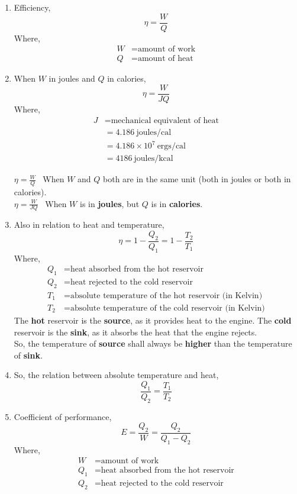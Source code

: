\documentclass[12pt]{article}
\begin{document}
\begin{enumerate}[label=\roman*.]
	\item Efficiency,
		$$ \eta = \frac{W}{Q} $$
		Where,
		\begin{align*}
			W &= \text{amount of work} \\
			Q &= \text{amount of heat}
		\end{align*}

	\item When $W$ in joules and $Q$ in calories,
		$$ \eta = \frac{W}{JQ} $$
		Where,
		\begin{align*}
			J  &= \text{mechanical equivalent of heat} \\
			   &= 4.186 \ \text{joules/cal} \\
			   &= 4.186 \times 10^7 \ \text{ergs/cal} \\
			   &= 4186 \ \text{joules/kcal}
		\end{align*}

	$ \eta = \frac{W}{Q} $ \rightarrow \ When $W$ and $Q$ both are in the same
		unit (both in joules or both in calories). \\
	$ \eta = \frac{W}{JQ} $ \rightarrow \ When $W$ is in \textbf{joules}, but
		$Q$ is in \textbf{calories}.

	\item Also in relation to heat and temperature,
		$$ \eta = 1 - \frac{Q_{2}}{Q_{1}} = 1 - \frac{T_{2}}{T_{1}} $$
		Where,
		\begin{align*}
			Q_{1} &= \text{heat absorbed from the hot reservoir} \\
			Q_{2} &= \text{heat rejected to the cold reservoir} \\
			T_{1} &= \text{absolute temperature of the hot reservoir (in Kelvin)} \\
			T_{2} &= \text{absolute temperature of the cold reservoir (in Kelvin)}
		\end{align*}
		The \textbf{hot} reservoir is the \textbf{source}, as it provides heat
		to the engine. The \textbf{cold} reservoir is the \textbf{sink}, as it
		absorbs the heat that the engine rejects. \\
		So, the temperature of \textbf{source} shall always be \textbf{higher}
		than the temperature of \textbf{sink}.

	\item So, the relation between absolute temperature and heat,
		$$ \frac{Q_{1}}{Q_{2}} = \frac{T_{1}}{T_{2}} $$

	\item Coefficient of performance,
		$$ E = \frac{Q_2}{W} = \frac{Q_2}{Q_1 - Q_2} $$
		Where,
		\begin{align*}
			W &= \text{amount of work} \\
			Q_{1} &= \text{heat absorbed from the hot reservoir} \\
			Q_{2} &= \text{heat rejected to the cold reservoir}
		\end{align*}
\end{enumerate}
\end{document}
